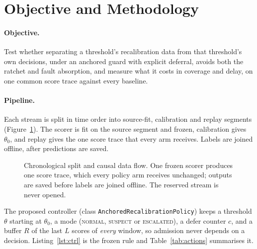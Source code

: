 \section{Objective and Methodology}\label{sec:methodology}

\paragraph{Objective.}
Test whether separating a threshold's recalibration data from that threshold's own
decisions, under an anchored guard with explicit deferral, avoids both the ratchet and
fault absorption, and measure what it costs in coverage and delay, on one common score
trace against every baseline.

\paragraph{Pipeline.}
Each stream is split in time order into source-fit, calibration and replay segments
(Figure~\ref{fig:flow}). The scorer is fit on the source segment and frozen,
calibration gives $\theta_0$, and replay gives the one score trace that every arm
receives. Labels are joined offline, after predictions are saved.

\begin{figure}[H]
  \centering
  \caption{Chronological split and causal data flow. One frozen scorer produces one
  score trace, which every policy arm receives unchanged; outputs are saved before
  labels are joined offline. The reserved stream is never opened.}
  \label{fig:flow}
\end{figure}

The proposed controller (class \texttt{AnchoredRecalibrationPolicy}) keeps a threshold
$\theta$ starting at $\theta_0$, a mode (\textsc{normal}, \textsc{suspect} or
\textsc{escalated}), a defer counter $c$, and a buffer $R$ of the last $L$ scores of
\emph{every} window, so admission never depends on a decision. Listing~\ref{lst:ctrl}
is the frozen rule and Table~\ref{tab:actions} summarises it.

